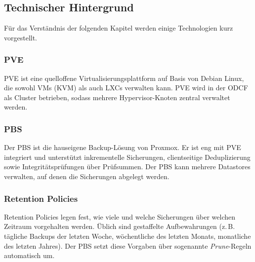 \subsection{Technischer Hintergrund}
\label{sec:Voraussetzungen}
Für das Verständnis der folgenden Kapitel werden einige Technologien kurz
vorgestellt.

\subsubsection{\acl{PVE}}
\acl{PVE} ist eine quelloffene Virtualisierungsplattform auf Basis von
Debian Linux, die sowohl \acp{VM} (KVM) als auch \acp{LXC} verwalten kann.
\ac{PVE} wird in der \ac{ODCF} als Cluster betrieben, sodass mehrere
Hypervisor-Knoten zentral verwaltet werden.

\subsubsection{\acl{PBS}}
Der \ac{PBS} ist die hauseigene Backup-Lösung von Proxmox.
Er ist eng mit \ac{PVE} integriert und unterstützt inkrementelle
Sicherungen, clientseitige Deduplizierung sowie Integritätsprüfungen
über Prüfsummen.
Der \ac{PBS} kann mehrere Datastores verwalten, auf denen die Sicherungen
abgelegt werden.

\subsubsection{Retention Policies}
Retention Policies legen fest, wie viele und welche Sicherungen über
welchen Zeitraum vorgehalten werden. Üblich sind gestaffelte
Aufbewahrungen (z.\,B. tägliche Backups der letzten Woche, wöchentliche
des letzten Monats, monatliche des letzten Jahres). Der \ac{PBS} setzt
diese Vorgaben über sogenannte \emph{Prune}-Regeln automatisch um.
